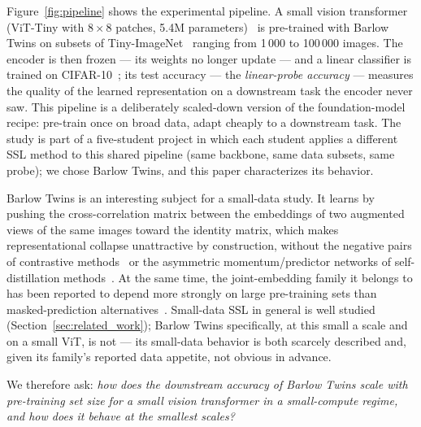 Figure~\ref{fig:pipeline} shows the experimental pipeline. A small vision
transformer (ViT-Tiny with $8\times8$ patches, 5.4M
parameters)~\cite{dosovitskiy2021vit,touvron2021deit} is pre-trained with
Barlow Twins on subsets of Tiny-ImageNet~\cite{le2015tinyimagenet} ranging
from 1\,000 to 100\,000 images. The encoder is then frozen --- its weights
no longer update --- and a linear classifier is trained on
CIFAR-10~\cite{krizhevsky2009cifar}; its test
accuracy --- the \emph{linear-probe accuracy} --- measures the quality of the
learned representation on a downstream task the encoder never saw. This
pipeline is a deliberately scaled-down version of the foundation-model
recipe: pre-train once on broad data, adapt cheaply to a downstream task.
The study is part of a five-student project in which each student applies a
different SSL method to this shared pipeline (same backbone, same data
subsets, same probe); we chose Barlow Twins, and this paper characterizes
its behavior.

Barlow Twins is an interesting subject for a small-data study. It learns by
pushing the cross-correlation matrix between the embeddings of two augmented
views of the same images toward the identity matrix, which makes
representational collapse unattractive by construction, without the negative
pairs of contrastive methods~\cite{chen2020simclr} or the asymmetric
momentum/predictor networks of self-distillation
methods~\cite{grill2020byol,caron2021dino}. At the same time, the
joint-embedding family it belongs to has been reported to depend more
strongly on large pre-training sets than masked-prediction
alternatives~\cite{elnouby2021largescale}. Small-data SSL in general is well
studied (Section~\ref{sec:related_work}); Barlow Twins specifically, at this
small a scale and on a small ViT, is not --- its small-data behavior is both
scarcely described and, given its family's reported data appetite, not
obvious in advance.

We therefore ask: \emph{how does the downstream accuracy of Barlow Twins
scale with pre-training set size for a small vision transformer in a
small-compute regime, and how does it behave at the smallest scales?}

